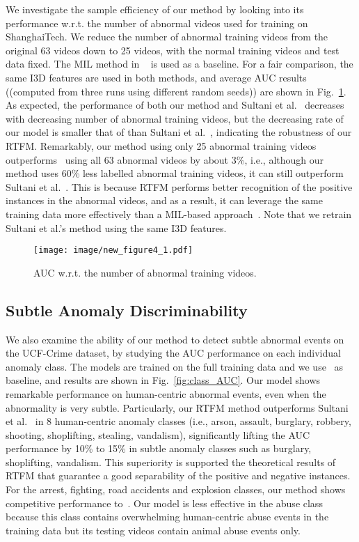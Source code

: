 \documentclass[10pt,twocolumn,letterpaper]{article}
\begin{document}
We investigate the sample efficiency of our method by looking into its performance w.r.t. the number of abnormal videos used for training on ShanghaiTech. We reduce the number of abnormal training videos from the original 63 videos down to 25 videos, with the normal training videos and test data fixed. The MIL method in ~\cite{sultani2018real} is used as a baseline. For a fair comparison, the same I3D features are used in both methods,  and average AUC results ((computed from three runs using different random seeds)) are shown in Fig.~\ref{fig:num_abnormal}. As expected, the performance of both our method and Sultani et al.~\cite{sultani2018real} decreases with decreasing number of abnormal training videos, but the decreasing rate of our model is smaller that of than Sultani et al.~\cite{sultani2018real}, indicating the robustness of our RTFM. Remarkably, our method using only 25 abnormal training videos outperforms~\cite{sultani2018real} using all 63 abnormal videos by about 3\%, i.e., although our method uses 60\% less labelled abnormal training videos, it can still outperform Sultani et al.~\cite{sultani2018real}. This is because RTFM performs better recognition of the positive instances in the abnormal videos, and as a result, it can leverage the same training data more effectively than a MIL-based approach~\cite{sultani2018real}. Note that we retrain Sultani et al.'s method using the same I3D features.  

\begin{figure}[h!]
\begin{center}
\texttt{[image: image/new\_figure4\_1.pdf]}
\end{center}
   \caption{AUC w.r.t. the number of abnormal training videos. 
}
\label{fig:num_abnormal}
\end{figure}

\subsection{Subtle Anomaly Discriminability}

We also examine the ability of our method to detect subtle abnormal events on the UCF-Crime dataset, by studying the AUC performance on each individual anomaly class. 
The models are trained on the full training data and we use~\cite{sultani2018real} as baseline, and results are shown in Fig.~\ref{fig:class_AUC}. Our model shows remarkable performance on human-centric abnormal events, even when the abnormality is very subtle. Particularly, our RTFM method outperforms Sultani et al.~\cite{sultani2018real} in 8 human-centric anomaly classes (i.e., arson, assault, burglary, robbery, shooting, shoplifting, stealing, vandalism), significantly lifting the AUC performance by 10\% to 15\% in subtle anomaly classes such as burglary, shoplifting, vandalism. This superiority is supported the theoretical results of RTFM that guarantee a good separability of the positive and negative instances. For the arrest, fighting, road accidents and explosion classes, our method shows competitive performance to~\cite{sultani2018real}. Our model is less effective in the abuse class because this class contains overwhelming human-centric abuse events in the training data but its testing videos contain animal abuse events only. 
\end{document}
